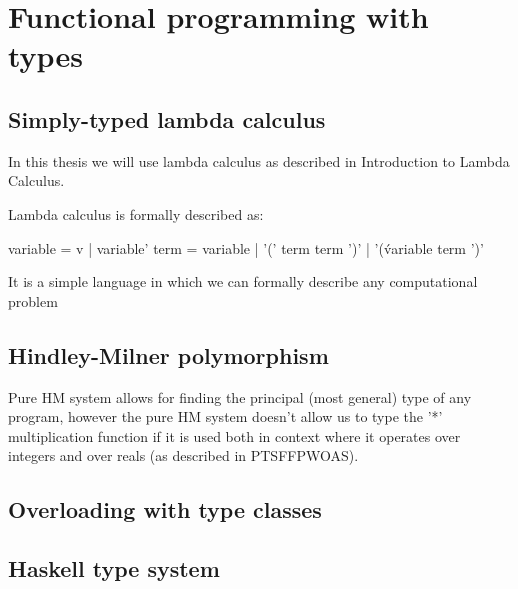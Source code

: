 \chapter{Functional programming with types}


\section{Simply-typed lambda calculus}

In this thesis we will use lambda calculus as described in Introduction to Lambda Calculus.  %

Lambda calculus is formally described as:

variable = v | variable'
term = variable | '(' term term ')' |  '(\' variable term ')'

It is a simple language in which we can formally describe any computational problem


\section{Hindley-Milner polymorphism}

Pure HM system allows for finding the principal (most general) type of any program, however
the pure HM system doesn't allow us to type the '*' multiplication function if it is used both
in context where it operates over integers and over reals (as described in PTSFFPWOAS). %


\section{Overloading with type classes}




\section{Haskell type system}

